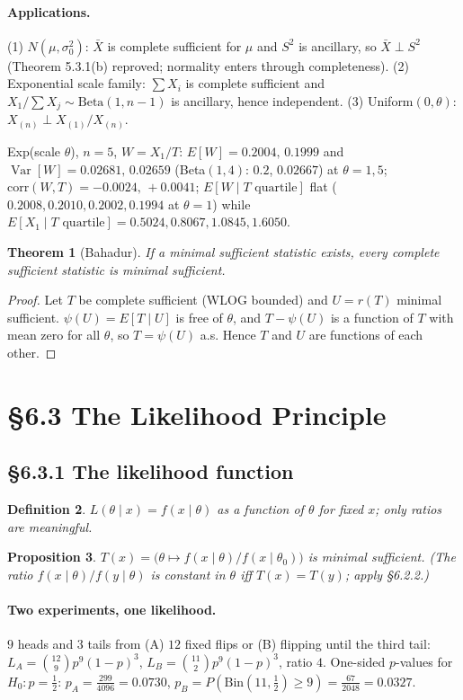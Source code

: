 \documentclass[11pt]{article}
\newtheorem{theorem}{Theorem}[section]
\newtheorem{definition}[theorem]{Definition}
\newtheorem{proposition}[theorem]{Proposition}
\DeclareMathOperator{\Var}{Var}\DeclareMathOperator{\Cov}{Cov}\DeclareMathOperator{\E}{E}
\begin{document}
\paragraph{Applications.} (1) $N(\mu,\sigma_0^2)$: $\bar X$ is complete sufficient for $\mu$ and $S^2$ is ancillary, so $\bar X\perp S^2$ (Theorem 5.3.1(b) reproved; normality enters through completeness). (2) Exponential scale family: $\sum X_i$ is complete sufficient and $X_1/\sum X_j\sim\mathrm{Beta}(1,n-1)$ is ancillary, hence independent. (3) Uniform$(0,\theta)$: $X_{(n)}\perp X_{(1)}/X_{(n)}$.
\begin{simbox}
Exp(scale $\theta$), $n=5$, $W=X_1/T$: $E[W]=0.2004,\,0.1999$ and $\Var[W]=0.02681,\,0.02659$ (Beta$(1,4)$: $0.2$, $0.02667$) at $\theta=1,5$; $\mathrm{corr}(W,T)=-0.0024,\,+0.0041$; $E[W\mid T\text{ quartile}]$ flat ($0.2008,0.2010,0.2002,0.1994$ at $\theta=1$) while $E[X_1\mid T\text{ quartile}]=0.5024,0.8067,1.0845,1.6050$.
\end{simbox}
\begin{theorem}[Bahadur]
If a minimal sufficient statistic exists, every complete sufficient statistic is minimal sufficient.
\end{theorem}
\begin{proof}
Let $T$ be complete sufficient (WLOG bounded) and $U=r(T)$ minimal sufficient. $\psi(U)=E[T\mid U]$ is free of $\theta$, and $T-\psi(U)$ is a function of $T$ with mean zero for all $\theta$, so $T=\psi(U)$ a.s. Hence $T$ and $U$ are functions of each other.
\end{proof}

\section{\S6.3 The Likelihood Principle}
\subsection{\S6.3.1 The likelihood function}
\begin{definition}
$L(\theta\mid x)=f(x\mid\theta)$ as a function of $\theta$ for fixed $x$; only ratios are meaningful.
\end{definition}
\begin{proposition}
$T(x)=\big(\theta\mapsto f(x\mid\theta)/f(x\mid\theta_0)\big)$ is minimal sufficient. (The ratio $f(x\mid\theta)/f(y\mid\theta)$ is constant in $\theta$ iff $T(x)=T(y)$; apply \S6.2.2.)
\end{proposition}
\paragraph{Two experiments, one likelihood.} $9$ heads and $3$ tails from (A) $12$ fixed flips or (B) flipping until the third tail: $L_A=\binom{12}{9}p^9(1-p)^3$, $L_B=\binom{11}{2}p^9(1-p)^3$, ratio $4$. One-sided $p$-values for $H_0:p=\frac12$: $p_A=\frac{299}{4096}=0.0730$, $p_B=P(\mathrm{Bin}(11,\frac12)\ge9)=\frac{67}{2048}=0.0327$.
\end{document}
